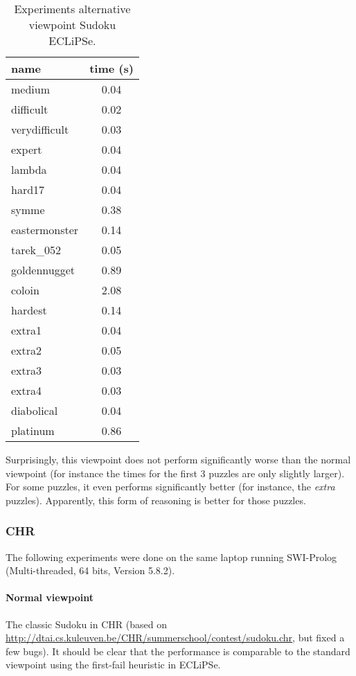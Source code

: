 \begin{table}[hbpt]
 \centering
\begin{tabular}{l S}\toprule
name & {time (s)} \\ \midrule
medium  &  0.04\\
difficult & 0.02\\
verydifficult & 0.03\\
expert & 0.04\\
lambda & 0.04\\
hard17 & 0.04\\
symme & 0.38\\
eastermonster & 0.14\\
tarek\_052 & 0.05\\
goldennugget & 0.89\\
coloin & 2.08\\
hardest & 0.14\\
extra1 & 0.04\\
extra2 & 0.05\\
extra3 & 0.03\\
extra4 & 0.03\\
diabolical & 0.04\\
platinum & 0.86\\ \bottomrule
\end{tabular}
\caption{Experiments alternative viewpoint Sudoku ECLiPSe.}
\label{tab:alternativeeclipse}
\end{table}

Surprisingly, this viewpoint does not perform significantly worse than the normal viewpoint (for instance the times for the first 3 puzzles are only slightly larger). For some puzzles, it even performs significantly better (for instance, the \emph{extra} puzzles). Apparently, this form of reasoning is better for those puzzles.



\clearpage
\subsubsection{CHR}
The following experiments were done on the same laptop running SWI-Prolog (Multi-threaded, 64 bits, Version 5.8.2).
\paragraph{Normal viewpoint}
The classic Sudoku in CHR (based on \url{http://dtai.cs.kuleuven.be/CHR/summerschool/contest/sudoku.chr}, but fixed a few bugs). It should be clear that the performance is comparable to the standard viewpoint using the first-fail heuristic in ECLiPSe.

